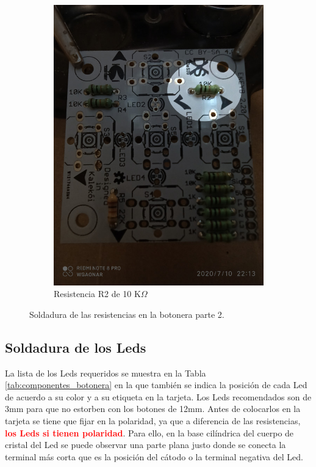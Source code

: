 \documentclass{article}
\begin{document}
\begin{figure}[H]
\begin{subfigure}[t]{0.3\textwidth}
        \includegraphics[width=0.9\columnwidth, height=1.2\columnwidth]{images/Botonera/botonera6.jpg}
        \caption{Resistencia R2 de 10 K$\Omega$}
        \label{fig:botonera_resistencias6}
    \end{subfigure}
    \caption{Soldadura de las resistencias en la botonera parte 2.}
    \label{fig:botonera_resistencias_parte2}
\end{figure}

\subsection{Soldadura de los Leds}
La lista de los Leds requeridos se muestra en la Tabla \ref{tab:componentes_botonera} en la que también se indica la posición de cada Led de acuerdo a su color y a su etiqueta en la tarjeta. Los Leds recomendados son de 3mm para que no estorben con los botones de 12mm. Antes de colocarlos en la tarjeta se tiene que fijar en la polaridad, ya que a diferencia de las resistencias, \textbf{\textcolor{red}{los Leds si tienen polaridad}}. Para ello, en la base cilíndrica del cuerpo de cristal del Led se puede observar una parte plana justo donde se conecta la terminal más corta que es la posición del cátodo o la terminal negativa del Led. 
\end{document}
